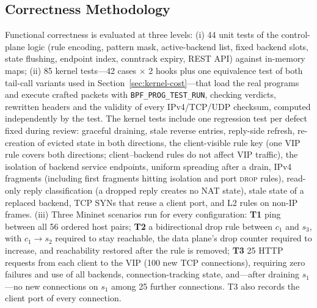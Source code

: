 \documentclass[conference]{IEEEtran}
\begin{document}
\subsection{Correctness Methodology}
Functional correctness is evaluated at three levels: (i) 44 unit tests of the
control-plane logic (rule encoding, pattern mask, active-backend list, fixed
backend slots, state flushing, endpoint index, conntrack expiry, REST API)
against in-memory maps; (ii) 85 kernel tests---42 cases $\times$ 2 hooks plus
one equivalence test of both tail-call variants used in
Section~\ref{sec:kernel-cost}---that load the real
programs and execute crafted packets with \texttt{BPF\_PROG\_TEST\_RUN},
checking verdicts, rewritten headers and the validity of every
IPv4/TCP/UDP checksum, computed independently by the test. The kernel tests
include one regression test per defect fixed during review: graceful
draining, stale reverse entries, reply-side refresh, re-creation of evicted
state in both directions, the client-visible rule key (one VIP rule covers
both directions; client--backend rules do not affect VIP traffic), the
isolation of backend service endpoints, uniform spreading after a drain,
IPv4 fragments (including first fragments hitting isolation and port
\textsc{drop} rules), read-only reply classification (a dropped reply creates
no NAT state), stale state of a replaced backend, TCP SYNs that reuse a client
port, and L2 rules on non-IP frames. (iii) Three Mininet
scenarios run for every configuration: \textbf{T1} ping between all 56
ordered host pairs; \textbf{T2} a bidirectional drop rule between $c_1$ and
$s_3$, with $c_1 \to s_2$ required to stay reachable, the data plane's drop
counter required to increase, and reachability restored after the rule is
removed; \textbf{T3} 25 HTTP requests from each client to the VIP (100 new
TCP connections), requiring zero failures and use of all backends,
connection-tracking state, and---after draining $s_1$---no new connections on
$s_1$ among 25 further connections. T3 also records the client port of
every connection.
\end{document}
